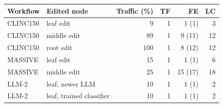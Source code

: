 \begin{tabular}{llrrrr}
\toprule
Workflow & Edited node & Traffic (\%) & TF & FE & LC \\
\midrule
CLINC150 & leaf edit & 9 & 1 & 1 (1) & 3 \\
CLINC150 & middle edit & 89 & 1 & 9 (11) & 12 \\
CLINC150 & root edit & 100 & 1 & 8 (12) & 12 \\
MASSIVE & leaf edit & 15 & 1 & 1 (1) & 6 \\
MASSIVE & middle edit & 25 & 1 & 15 (17) & 18 \\
LLM-2 & leaf, newer LLM & 10 & 1 & 1 (1) & 2 \\
LLM-2 & leaf, trained classifier & 10 & 1 & 1 (1) & 2 \\
\bottomrule
\end{tabular}
